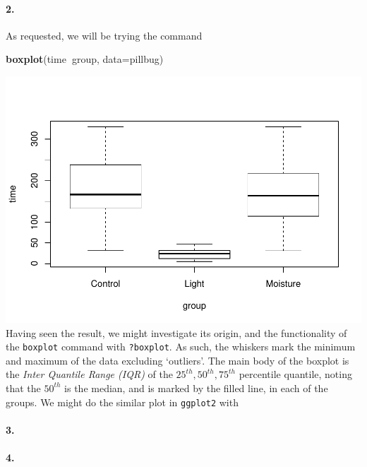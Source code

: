 \documentclass[
]{article}
\newenvironment{Shaded}{\begin{snugshade}}{\end{snugshade}}
\newcommand{\DataTypeTok}[1]{\textcolor[rgb]{0.13,0.29,0.53}{#1}}
\newcommand{\KeywordTok}[1]{\textcolor[rgb]{0.13,0.29,0.53}{\textbf{#1}}}
\newcommand{\NormalTok}[1]{#1}
\newcommand{\OperatorTok}[1]{\textcolor[rgb]{0.81,0.36,0.00}{\textbf{#1}}}
\begin{document}
\hypertarget{section-82}{%
\paragraph{\texorpdfstring{\textbf{2.}}{2.}}\label{section-82}}

As requested, we will be trying the command

\begin{Shaded}
\begin{Highlighting}[]
\KeywordTok{boxplot}\NormalTok{(time}\OperatorTok{~}\NormalTok{group, }\DataTypeTok{data=}\NormalTok{pillbug)}
\end{Highlighting}
\end{Shaded}

\includegraphics{matstatproblems20-21_files/figure-latex/unnamed-chunk-85-1.pdf}
Having seen the result, we might investigate its origin, and the
functionality of the \texttt{boxplot} command with \texttt{?boxplot}. As
such, the whiskers mark the minimum and maximum of the data excluding
`outliers'. The main body of the boxplot is the \emph{Inter Quantile
Range (IQR)} of the \(25^{th}, 50^{th}, 75^{th}\) percentile quantile,
noting that the \(50^{th}\) is the median, and is marked by the filled
line, in each of the groups. We might do the similar plot in
\texttt{ggplot2} with

\hypertarget{section-83}{%
\paragraph{\texorpdfstring{\textbf{3.}}{3.}}\label{section-83}}

\hypertarget{section-84}{%
\paragraph{\texorpdfstring{\textbf{4.}}{4.}}\label{section-84}}
\end{document}
